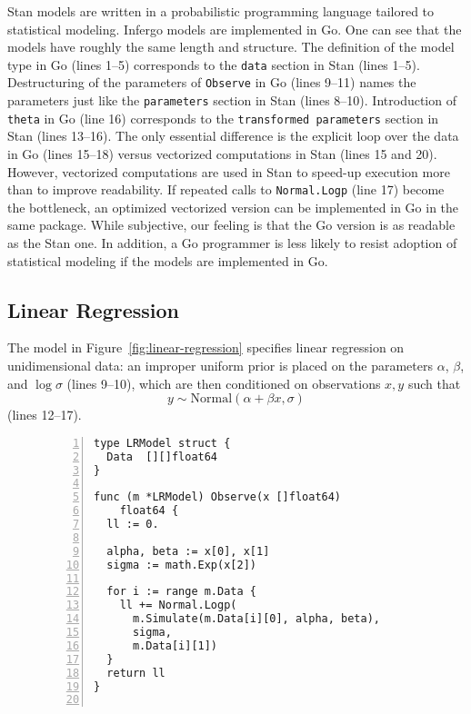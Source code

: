 \documentclass[sigplan,review,10pt,anonymous]{acmart}
\begin{document}
\begin{sloppypar}
Stan models are written in a probabilistic programming language
tailored to statistical modeling. Infergo models are implemented
in Go. One can see that the models have roughly the same length
and structure. The definition of the model type in Go (lines
1--5) corresponds to the \lstinline{data} section in Stan (lines
1--5). Destructuring of the parameters of \lstinline{Observe} in
Go (lines 9--11) names the parameters just like the
\lstinline{parameters} section in Stan (lines 8--10).
Introduction of \lstinline{theta} in Go (line 16) corresponds to
the \lstinline{transformed parameters} section in Stan (lines
13--16). The only essential difference is the explicit loop over
the data in Go (lines 15--18) versus vectorized computations in
Stan (lines 15 and 20). However, vectorized computations are used
in Stan to speed-up execution more than to improve readability.
If repeated calls to \lstinline{Normal.Logp} (line 17) become
the bottleneck, an optimized vectorized version can be
implemented in Go in the same package. While subjective, our
feeling is that the Go version is as readable as the Stan one.
In addition, a Go programmer is less likely to resist adoption
of statistical modeling if the models are implemented in Go.

\subsection{Linear Regression}
\label{sec:linear-regression}

The model in Figure~\ref{fig:linear-regression} specifies linear
regression on unidimensional data: an improper uniform prior is
placed on the parameters $\alpha$, $\beta$, and $\log \sigma$
(lines 9--10), which are then conditioned on observations $x, y$
such that
\begin{equation}
y \sim \mathrm{Normal}(\alpha + \beta x, \sigma)
	\label{eqn:linear-regression-1}
\end{equation}
(lines 12--17).
\begin{figure}
\begin{lstlisting}[framexleftmargin=10pt,numbers=left]
type LRModel struct {
  Data  [][]float64
}

func (m *LRModel) Observe(x []float64)
    float64 {
  ll := 0.

  alpha, beta := x[0], x[1]
  sigma := math.Exp(x[2])

  for i := range m.Data {
    ll += Normal.Logp(
      m.Simulate(m.Data[i][0], alpha, beta),
	  sigma,
	  m.Data[i][1])
  }
  return ll
}


\end{lstlisting}
\end{figure}
\end{sloppypar}
\end{document}
